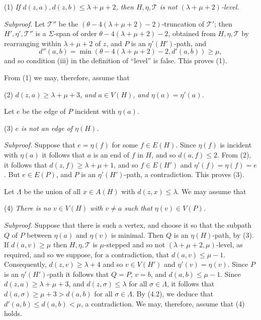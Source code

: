 \hspace*{12pt}(1) \textit{If $d(z, a), d(z, b) \le \lambda + \mu + 2$, then $H, \eta, \mathcal{T}$ is not $(\lambda + \mu + 2)$-level.}

\textit{Subproof.} Let $\mathcal{T}''$ be the $(\theta - 4(\lambda + \mu + 2) - 2)$-truncation of $\mathcal{T}'$; then $H', \eta', \mathcal{T}''$ is a $\Sigma$-span of order $\theta - 4(\lambda + \mu + 2) - 2$, obtained from $H, \eta, \mathcal{T}$ by rearranging within $\lambda + \mu + 2$ of $z$, and $P$ is an $\eta'(H')$-path, and
\begin{equation*}
d''(a, b) = \min(\theta - 4(\lambda + \mu + 2) - 2, d'(a, b)) \ge \mu,
\end{equation*}
and so condition (iii) in the definition of ``level'' is false. This proves (1).

From (1) we may, therefore, assume that

\hspace*{12pt}(2) \textit{$d(z, a) \ge \lambda + \mu + 3$, and $a \in V(H)$, and $\eta(a) = \eta'(a)$.}

Let $e$ be the edge of $P$ incident with $\eta(a)$.

\hspace*{12pt}(3) \textit{$e$ is not an edge of $\eta(H)$.}

\textit{Subproof.} Suppose that $e = \eta(f)$ for some $f \in E(H)$. Since $\eta(f)$ is incident with $\eta(a)$ it follows that $a$ is an end of $f$ in $H$, and so $d(a, f) \le 2$. From (2), it follows that $d(z, f) \ge \lambda + \mu + 1$, and so $f \in E(H')$ and $\eta'(f) = \eta(f) = e$. But $e \in E(P)$, and $P$ is an $\eta'(H')$-path, a contradiction. This proves (3).

Let $\Lambda$ be the union of all $x \in A(H)$ with $d(z, x) \le \lambda$. We may assume that

\hspace*{12pt}(4) \textit{There is no $v \in V(H)$ with $v \ne a$ such that $\eta(v) \in V(P)$.}

\textit{Subproof.} Suppose that there is such a vertex, and choose it so that the subpath $Q$ of $P$ between $\eta(a)$ and $\eta(v)$ is minimal. Then $Q$ is an $\eta(H)$-path, by (3). If $d(a, v) \ge \mu$ then $H, \eta, \mathcal{T}$ is $\mu$-stepped and so not $(\lambda + \mu + 2, \mu)$-level, as required, and so we suppose, for a contradiction, that $d(a, v) \le \mu - 1$. Consequently, $d(z, v) \ge \lambda + 4$ and so $v \in V(H')$ and $\eta'(v) = \eta(v)$. Since $P$ is an $\eta'(H')$-path it follows that $Q = P$, $v = b$, and $d(a, b) \le \mu - 1$. Since $d(z, a) \ge \lambda + \mu + 3$, and $d(z, \sigma) \le \lambda$ for all $\sigma \in \Lambda$, it follows that $d(a, \sigma) \ge \mu + 3 > d(a, b)$ for all $\sigma \in \Lambda$. By (4.2), we deduce that $d'(a, b) \le d(a, b) < \mu$, a contradiction. We may, therefore, assume that (4) holds.

